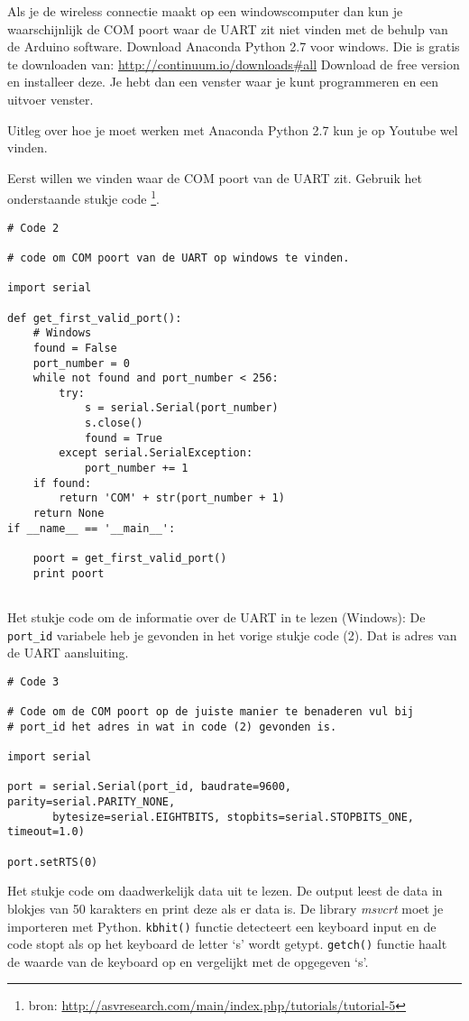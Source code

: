 Als je de wireless connectie maakt op een windowscomputer dan kun je 
waarschijnlijk de COM poort waar de UART zit niet vinden met de behulp van de 
Arduino software. Download Anaconda Python 2.7 voor windows.
Die is gratis te downloaden van: \url{http://continuum.io/downloads#all}
Download de free version en installeer deze. Je hebt dan een venster waar je kunt
programmeren en een uitvoer venster.

Uitleg over hoe je moet werken met Anaconda Python 2.7 kun je op Youtube wel vinden.

Eerst willen we vinden waar de COM poort van de UART zit. Gebruik het onderstaande 
stukje code \footnote{bron: \url{http://asvresearch.com/main/index.php/tutorials/tutorial-5}}.

\begin{verbatim}
# Code 2

# code om COM poort van de UART op windows te vinden.

import serial
 
def get_first_valid_port():
    # Windows
    found = False
    port_number = 0
    while not found and port_number < 256:
        try:
            s = serial.Serial(port_number)
            s.close()
            found = True
        except serial.SerialException:
            port_number += 1
    if found:
        return 'COM' + str(port_number + 1)
    return None
if __name__ == '__main__': 

    poort = get_first_valid_port()
    print poort
    
\end{verbatim}

Het stukje code om de informatie over de UART in te lezen (Windows):
De \verb|port_id| variabele heb je gevonden in het vorige stukje code (2).
Dat is adres van de UART aansluiting.

\begin{verbatim}
# Code 3

# Code om de COM poort op de juiste manier te benaderen vul bij 
# port_id het adres in wat in code (2) gevonden is.

import serial 

port = serial.Serial(port_id, baudrate=9600, parity=serial.PARITY_NONE, 
       bytesize=serial.EIGHTBITS, stopbits=serial.STOPBITS_ONE, timeout=1.0) 

port.setRTS(0)

\end{verbatim}

Het stukje code om daadwerkelijk data uit te lezen. De output leest de
data in blokjes van 50 karakters en print deze als er data is. De
library \emph{msvcrt} moet je importeren met Python. \verb|kbhit()|
functie detecteert een keyboard input en de code stopt als op het keyboard de
letter `s' wordt getypt. \verb|getch()| functie haalt de waarde van de keyboard 
 op en vergelijkt met de opgegeven `s'.

